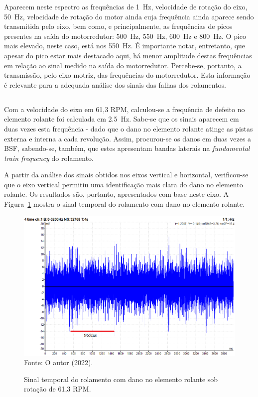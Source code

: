 \documentclass[
	12pt,				
	oneside,			
	a4paper,			
	english,			
	brazil,			
	]{abntex2ppgsi}
\begin{document}
Aparecem neste espectro as frequências de \SI{1}{\hertz}, velocidade de rotação do eixo, \SI{50}{\hertz}, velocidade de rotação do motor ainda cuja frequência ainda aparece sendo transmitida pelo eixo, bem como, e principalmente, as frequências de picos presentes na saída do motorredutor:  \SI{500}{\hertz}, \SI{550}{\hertz}, \SI{600}{\hertz} e \SI{800}{\hertz}. O pico mais elevado, neste caso, está nos \SI{550}{\hertz}. É importante notar, entretanto, que apesar do pico estar mais destacado aqui, há menor amplitude destas frequências em relação ao sinal medido na saída do motorredutor. Percebe-se, portanto, a transmissão, pelo eixo motriz, das frequências do motorredutor. Esta informação é relevante para a adequada análise dos sinais das falhas dos rolamentos.

\subsection{}

Com a velocidade do eixo em 61,3 RPM, calculou-se a frequência de defeito no elemento rolante foi calculada em \SI{2,5}{\hertz}. Sabe-se que os sinais aparecem em duas vezes esta frequência - dado que o dano no elemento rolante atinge as pistas externa e interna a cada revolução. Assim, procurou-se os danos em duas vezes a BSF, sabendo-se, também, que estes apresentam bandas laterais na \textit{fundamental train frequency} do rolamento. 

A partir da análise dos sinais obtidos nos eixos vertical e horizontal, verificou-se que o eixo vertical permitiu uma identificação mais clara do dano no elemento rolante. Os resultados são, portanto, apresentados com base neste eixo. A Figura~\ref{dominio_tempo_defeito_rolante_acelerometro_100hz_anotado} mostra o sinal temporal do rolamento com dano no elemento rolante.

\begin{figure}[H]
\centering
\caption {Sinal temporal do rolamento com dano no elemento rolante sob rotação de 61,3 RPM.}
\includegraphics[width=\textwidth,keepaspectratio]{dominio_tempo_defeito_rolante_acelerometro_100hz_anotado} \\
Fonte: O autor (2022).
\label{dominio_tempo_defeito_rolante_acelerometro_100hz_anotado}
\end{figure}
\end{document}
